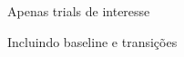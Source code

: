 \documentclass{article}
\begin{document}
\begin{figure}[!ht]
\caption{Apenas trials de interesse}
\noindent{}
\centering
\end{figure}

\begin{figure}[t]
\caption{Incluindo baseline e transições}
\noindent{}
\centering
\end{figure}
\end{document}
